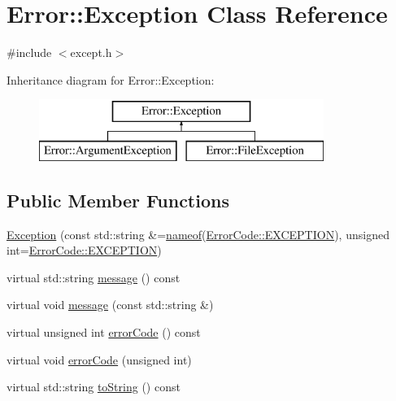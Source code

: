 \hypertarget{class_error_1_1_exception}{}\section{Error\+:\+:Exception Class Reference}
\label{class_error_1_1_exception}


{\ttfamily \#include $<$except.\+h$>$}

Inheritance diagram for Error\+:\+:Exception\+:\begin{figure}[H]
\begin{center}
\leavevmode
\includegraphics[height=2.000000cm]{class_error_1_1_exception}
\end{center}
\end{figure}
\subsection*{Public Member Functions}
\begin{DoxyCompactItemize}
\item 
\hyperlink{class_error_1_1_exception_a70a660fb0a4db6cf2292dec3a1fd498c}{Exception} (const std\+::string \&=\hyperlink{macros_8h_a235bdec0a6bf62f3b3af87e528109847}{nameof}(\hyperlink{namespace_error_1_1_error_code_ae85b7b550a5a82a4f04d8d5df167f081}{Error\+Code\+::\+E\+X\+C\+E\+P\+T\+I\+ON}), unsigned int=\hyperlink{namespace_error_1_1_error_code_ae85b7b550a5a82a4f04d8d5df167f081}{Error\+Code\+::\+E\+X\+C\+E\+P\+T\+I\+ON})
\item 
virtual std\+::string \hyperlink{class_error_1_1_exception_a74aebac49ea7118fdf16cf4a47d8723c}{message} () const
\item 
virtual void \hyperlink{class_error_1_1_exception_adebb86877e373ff1738d3959006ac166}{message} (const std\+::string \&)
\item 
virtual unsigned int \hyperlink{class_error_1_1_exception_ad0b9ea65370ae2a2a241fe998ccc6c77}{error\+Code} () const
\item 
virtual void \hyperlink{class_error_1_1_exception_a90ee3eaa75cc09bd7d0d1e843076f9a2}{error\+Code} (unsigned int)
\item 
virtual std\+::string \hyperlink{class_error_1_1_exception_a36cabfb6ea6390290ab4d67a6a30cca1}{to\+String} () const
\end{DoxyCompactItemize}

